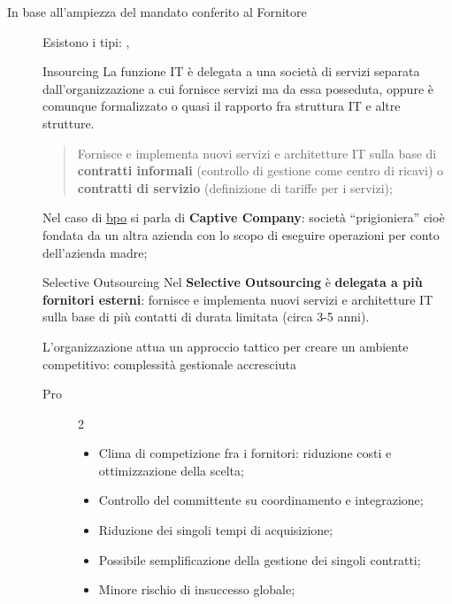 \begin{description}
    \item[In base all'ampiezza del mandato conferito al Fornitore] Esistono i tipi: , 
        \begin{definition}{Insourcing}{}
            La funzione IT è delegata a una società di servizi separata dall'organizzazione a cui fornisce servizi ma da essa posseduta, oppure è comunque formalizzato o quasi il rapporto fra struttura IT e altre strutture.
            \begin{quote}
                Fornisce e implementa nuovi servizi e architetture IT sulla base di \textbf{contratti informali} (controllo di gestione come centro di ricavi) o \textbf{contratti di servizio} (definizione di tariffe per i servizi);
            \end{quote}
            Nel caso di \hyperref[def:bpo]{\ac{bpo}} si parla di \textbf{Captive Company}: società ``prigioniera'' cioè fondata da un altra azienda con lo scopo di eseguire operazioni per conto dell'azienda madre;
        \end{definition}
        \begin{definition}{Selective Outsourcing}{}
            Nel \textbf{Selective Outsourcing} è \textbf{delegata a più fornitori esterni}: fornisce e implementa nuovi servizi e architetture IT sulla base di più contatti di durata limitata (circa 3-5 anni).
            \begin{note}
                L'organizzazione attua un approccio tattico per creare un ambiente competitivo: complessità gestionale accresciuta
            \end{note}
            \begin{description}
                \item[Pro]
                    \begin{multicols}{2}
                        \begin{itemize}
                            \item Clima di competizione fra i fornitori: riduzione costi e ottimizzazione della scelta;
                            \item Controllo del committente  su coordinamento e integrazione;
                            \item Riduzione dei singoli tempi di acquisizione;
                            \item Possibile semplificazione della gestione dei singoli contratti;
                            \item Minore rischio di insuccesso globale;

\end{itemize}
\end{multicols}
\end{description}
\end{definition}
\end{description}
